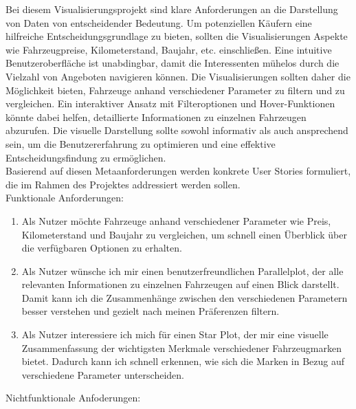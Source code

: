 \documentclass[usegeometry=true]{scrartcl}
\begin{document}
Bei diesem Visualisierungsprojekt sind klare Anforderungen an die Darstellung von Daten von entscheidender Bedeutung. Um potenziellen Käufern eine hilfreiche Entscheidungsgrundlage zu bieten, sollten die Visualisierungen Aspekte wie Fahrzeugpreise, Kilometerstand, Baujahr, etc. einschließen. Eine intuitive Benutzeroberfläche ist unabdingbar, damit die Interessenten mühelos durch die Vielzahl von Angeboten navigieren können. Die Visualisierungen sollten daher die Möglichkeit bieten, Fahrzeuge anhand verschiedener Parameter zu filtern und zu vergleichen. Ein interaktiver Ansatz mit Filteroptionen und Hover-Funktionen könnte dabei helfen, detaillierte Informationen zu einzelnen Fahrzeugen abzurufen. Die visuelle Darstellung sollte sowohl informativ als auch ansprechend sein, um die Benutzererfahrung zu optimieren und eine effektive Entscheidungsfindung zu ermöglichen.  \\
Basierend auf diesen Metaanforderungen werden konkrete User Stories formuliert, die im Rahmen des Projektes addressiert werden sollen. \\
Funktionale Anforderungen: \\
\begin{enumerate}

    \item Als Nutzer möchte  Fahrzeuge anhand verschiedener Parameter wie Preis, Kilometerstand und Baujahr zu vergleichen, um schnell einen Überblick über die verfügbaren Optionen zu erhalten.
    
    \item Als Nutzer wünsche ich mir einen benutzerfreundlichen Parallelplot, der alle relevanten Informationen zu einzelnen Fahrzeugen auf einen Blick darstellt. Damit kann ich die Zusammenhänge zwischen den verschiedenen Parametern besser verstehen und gezielt nach meinen Präferenzen filtern.
    
    \item Als Nutzer interessiere ich mich für einen Star Plot, der mir eine visuelle Zusammenfassung der wichtigsten Merkmale verschiedener Fahrzeugmarken bietet. Dadurch kann ich schnell erkennen, wie sich die Marken in Bezug auf verschiedene Parameter unterscheiden.
\end{enumerate}
Nichtfunktionale Anfoderungen: \\
\end{document}
